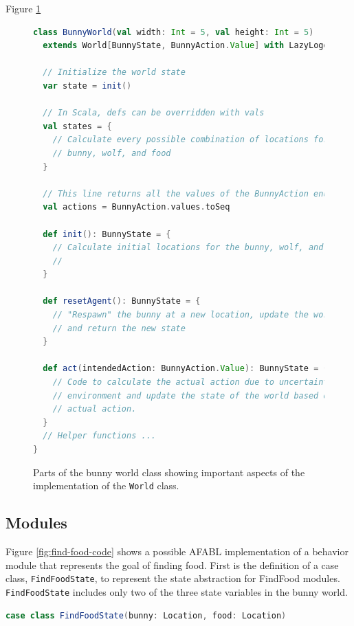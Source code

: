 Figure \ref{fig:bunny-world-code}

\begin{figure}[h]
\begin{center}

\begin{lstlisting}[language=Scala]
class BunnyWorld(val width: Int = 5, val height: Int = 5)
  extends World[BunnyState, BunnyAction.Value] with LazyLogging {

  // Initialize the world state
  var state = init()

  // In Scala, defs can be overridden with vals
  val states = {
    // Calculate every possible combination of locations for the
    // bunny, wolf, and food
  }

  // This line returns all the values of the BunnyAction enumeration
  val actions = BunnyAction.values.toSeq

  def init(): BunnyState = {
    // Calculate initial locations for the bunny, wolf, and food.
    //
  }

  def resetAgent(): BunnyState = {
    // "Respawn" the bunny at a new location, update the world state
    // and return the new state
  }

  def act(intendedAction: BunnyAction.Value): BunnyState = {
    // Code to calculate the actual action due to uncertainty in the
    // environment and update the state of the world based on the
    // actual action.
  }
  // Helper functions ...
}
\end{lstlisting}

\caption{Parts of the bunny world class showing important aspects of the implementation of the {\tt World} class.}
\end{center}
\label{fig:bunny-world-code}
\end{figure}


\subsection{Modules}

Figure \ref{fig:find-food-code} shows a possible AFABL implementation of a behavior module that represents the goal of finding food. First is the definition of a case class, {\tt FindFoodState}, to represent the state abstraction for FindFood modules. {\tt FindFoodState} includes only two of the three state variables in the bunny world.

\begin{center}
\begin{lstlisting}[language=Scala,frame=none]
case class FindFoodState(bunny: Location, food: Location)
\end{lstlisting}
\end{center}

